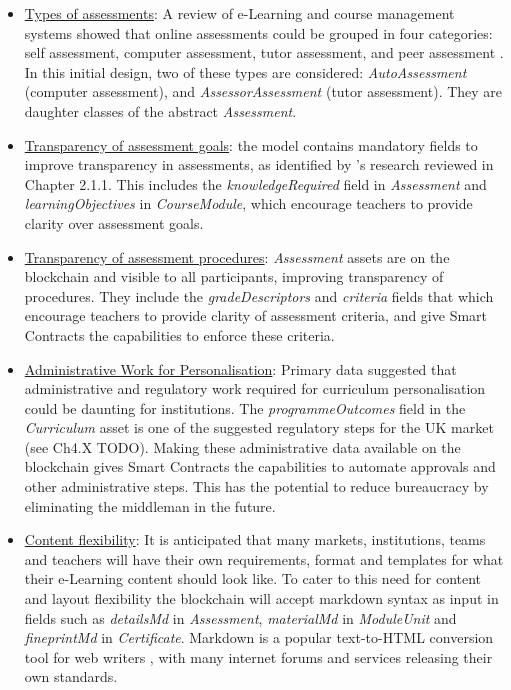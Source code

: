 \begin{itemize}
	\setlength\itemsep{0em}
	\item \underline{Types of assessments}: A review of e-Learning and course management systems showed that online assessments could be
	      grouped in four categories: self assessment, computer assessment, tutor assessment, and peer assessment
	      \citep[p.68]{paulsen2004online}. In this initial design, two of these types are considered: \textit{AutoAssessment} (computer
	      assessment), and \textit{AssessorAssessment} (tutor assessment). They are daughter classes of the abstract \textit{Assessment}.
	\item \underline{Transparency of assessment goals}: the model contains mandatory fields to improve transparency in assessments, as identified by
	      \citet{suhre2013determinants}'s research reviewed in Chapter 2.1.1. This includes the \textit{knowledgeRequired} field
	      in \textit{Assessment} and \textit{learningObjectives} in \textit{CourseModule}, which encourage teachers to provide
	      clarity over assessment goals.
	\item \underline{Transparency of assessment procedures}: \textit{Assessment} assets are on the blockchain and visible to all participants,
	      improving transparency of procedures.
	      They include the \textit{gradeDescriptors} and \textit{criteria} fields that which encourage teachers to provide clarity of
	      assessment criteria, and give Smart Contracts the capabilities to enforce these criteria.
	\item \underline{Administrative Work for Personalisation}: Primary data suggested that administrative and regulatory work required for
	      curriculum personalisation could be daunting for institutions. The \textit{programmeOutcomes} field in the \textit{Curriculum} asset is one of
	      the suggested regulatory steps for the UK market (see Ch4.X TODO). Making these administrative data available on the blockchain
	      gives Smart Contracts the capabilities to automate approvals and other administrative steps. This has the potential to reduce
	      bureaucracy by eliminating the middleman in the future.
	\item \underline{Content flexibility}: It is anticipated that many markets, institutions, teams and teachers
	      will have their own requirements, format and templates for what their e-Learning content should look like. To cater to
	      this need for content and layout flexibility the blockchain will accept markdown syntax as input in fields such as
	      \textit{detailsMd} in \textit{Assessment}, \textit{materialMd} in \textit{ModuleUnit} and \textit{fineprintMd} in \textit{Certificate}.
	      Markdown is a popular text-to-HTML conversion tool for web writers \citep{gruber2004markdown}, with many internet forums and
	      services releasing their own standards.
\end{itemize}

